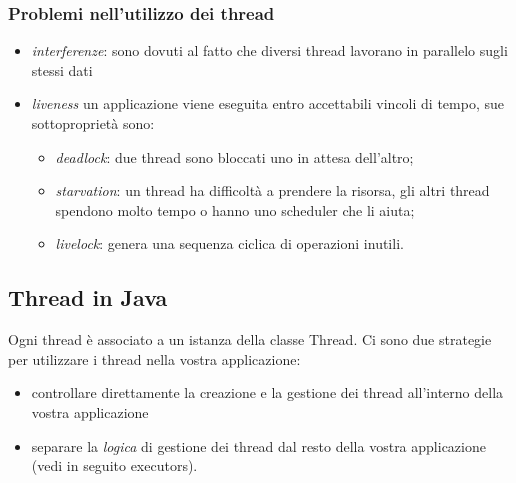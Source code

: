 \documentclass{article}
\begin{document}
\subsubsection{Problemi nell'utilizzo dei thread}
\begin{itemize}
\item \emph{interferenze}: sono dovuti al fatto che diversi thread lavorano in parallelo sugli stessi dati
\item \emph{liveness} un applicazione viene eseguita entro accettabili vincoli di tempo, sue sottopropriet\`a sono:
\begin{itemize}
\item \emph{deadlock}: due thread sono bloccati uno in attesa dell'altro;
\item \emph{starvation}: un thread ha difficolt\`a a prendere la risorsa, gli altri thread spendono molto tempo o hanno uno scheduler che li aiuta;
\item \emph{livelock}: genera una sequenza ciclica di operazioni inutili.
\end{itemize}
\end{itemize}

\subsection{Thread in Java}
Ogni thread \`e associato a un istanza della classe Thread. Ci sono due strategie per utilizzare i thread nella vostra applicazione:
\begin{itemize}
\item controllare direttamente la creazione e la gestione dei thread all'interno della vostra applicazione
\item separare la \emph{logica} di gestione dei thread dal resto della vostra applicazione (vedi in seguito executors).
\end{itemize}
\end{document}
